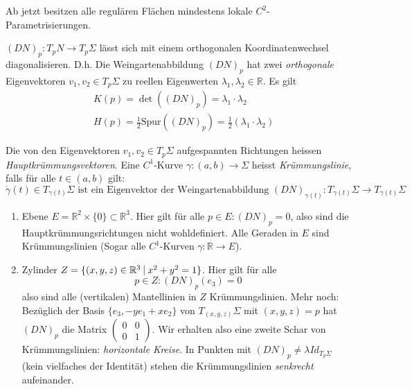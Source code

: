 \documentclass[../main.tex]{subfiles}
\begin{document}
\begin{assumption}
Ab jetzt besitzen alle regulären Flächen mindestens lokale \emph{$C^{2}$}-Parametrisierungen.
\end{assumption}
\begin{corollary}
    $(DN)_{p}:T_{p}N \rightarrow T_{p}\Sigma$ lässt sich mit einem orthogonalen Koordinatenwechsel diagonalisieren. 
    D.h. Die Weingartenabbildung $(DN)_{p}$ hat zwei \emph{orthogonale} Eigenvektoren $v_{1},v_{2} \in T_{p}\Sigma$ zu reellen Eigenwerten $\lambda_{1}, \lambda_{2} \in \mathbb{R} $.
    Es gilt \begin{align*}
        &K(p) = \det((DN)_{p}) = \lambda_{1} \cdot \lambda_{2}\\
        &H(p) = \frac{1}{2}\text{Spur}((DN)_{p}) = \frac{1}{2}(\lambda_{1} \cdot \lambda_{2})
    \end{align*}
\end{corollary}
\begin{definition}
    Die von den Eigenvektoren $v_{1}, v_{2} \in T_{p}\Sigma $ aufgespannten Richtungen heissen \emph{Hauptkrümmungsvektoren}. 
    Eine $C^{1}$-Kurve $\gamma:(a,b) \rightarrow \Sigma $ heisst \emph{Krümmungslinie}, falls 
    für alle $t \in (a,b)$ gilt:
    $$\dot{\gamma}(t)\in T_{\gamma(t)}\Sigma \text{ ist ein Eigenvektor der Weingartenabbildung } (DN)_{\gamma(t)}:T_{\gamma(t)}\Sigma \to T_{\gamma(t)}\Sigma $$
\end{definition}
\begin{examples}
    \leavevmode
    \begin{enumerate}
        \item Ebene $E = \mathbb{R}^{2} \times \{0\} \subset \mathbb{R}^{3}$.
        Hier gilt für alle $p \in E: (DN)_{p} = 0$, also sind die Hauptkrümmungsrichtungen nicht wohldefiniert.
        Alle Geraden in $E$ sind Krümmungslinien
        (Sogar alle $C^{1}$-Kurven $\gamma:\mathbb{R}\rightarrow E$).

        \item Zylinder $Z = \{(x,y,z)\in \mathbb{R}^{3} \ \vline \  x^{2} + y^{2} = 1 \}$.
        Hier gilt für alle $$p \in Z: (DN)_{p}(e_{3}) = 0$$ also sind alle (vertikalen) Mantellinien in $Z$ Krümmungslinien.
        Mehr noch: Bezüglich der Basis $\{e_{3}, -y e_{1} + x e_{2}\}$ von $T_{(x,y,z)}\Sigma$ mit $(x,y,z)=p$ hat $(DN)_{p}$ die \linebreak Matrix $\left(\begin{smallmatrix} 0 & 0 \\ 0 & 1 \end{smallmatrix} \right)$.
        Wir erhalten also eine zweite Schar von Krümmungslinien: \emph{horizontale Kreise}.
        In Punkten mit $(DN)_{p} \neq \lambda Id_{T_{p}\Sigma}$ (kein vielfaches der Identität) stehen die Krümmungslinien \emph{senkrecht} aufeinander.
    \end{enumerate}
\end{examples}
\end{document}
